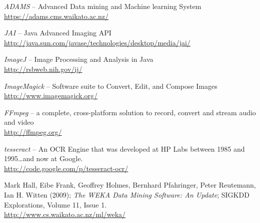 %

\begin{thebibliography}{999}

		\textit{ADAMS} -- Advanced Data mining and Machine learning System \\
		\url{https://adams.cms.waikato.ac.nz/}{}

	 	\textit{JAI} -- Java Advanced Imaging API \\
		\url{http://java.sun.com/javase/technologies/desktop/media/jai/}{}

		\textit{ImageJ} -- Image Processing and Analysis in Java \\
		\url{http://rsbweb.nih.gov/ij/}{}

		\textit{ImageMagick} -- Software suite to Convert, Edit, and Compose Images \\
		\url{http://www.imagemagick.org/}{}

		\textit{FFmpeg} -- a complete, cross-platform solution to record, convert and stream audio and video \\
		\url{http://ffmpeg.org/}{}

		\textit{tesseract} -- An OCR Engine that was developed at HP Labs between 1985 and 1995\ldots and now at Google. \\
		\url{http://code.google.com/p/tesseract-ocr/}{}

	 	Mark Hall, Eibe Frank, Geoffrey Holmes, Bernhard Pfahringer, Peter
	 	Reutemann, Ian H. Witten (2009); \textit{The WEKA Data Mining Software: An
	 	Update}; SIGKDD Explorations, Volume 11, Issue 1. \\
		\url{http://www.cs.waikato.ac.nz/ml/weka/}{}

\end{thebibliography}
